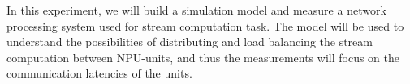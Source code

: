 In this experiment, we will build a simulation model and measure a network processing system used for stream computation task. The model will be used to understand the possibilities of distributing and load balancing the stream computation between NPU-units, and thus the measurements will focus on the communication latencies of the units.

